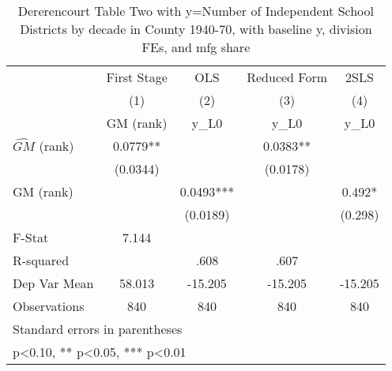 \begin{table}[htbp]\centering
\def\sym#1{\ifmmode^{#1}\else\(^{#1}\)\fi}
\caption{Dererencourt Table Two with y=Number of Independent School Districts by decade in County 1940-70, with baseline y, division FEs, and mfg share}
\begin{tabular}{l*{4}{c}}
\toprule
                    & First Stage   &         OLS   &Reduced Form   &        2SLS   \\
                    &\multicolumn{1}{c}{(1)}&\multicolumn{1}{c}{(2)}&\multicolumn{1}{c}{(3)}&\multicolumn{1}{c}{(4)}\\
                    &\multicolumn{1}{c}{GM  (rank)}&\multicolumn{1}{c}{y\_L0}&\multicolumn{1}{c}{y\_L0}&\multicolumn{1}{c}{y\_L0}\\
\midrule
$\hat{GM}$ (rank)   &      0.0779** &               &      0.0383** &               \\
                    &    (0.0344)   &               &    (0.0178)   &               \\
\addlinespace
GM  (rank)          &               &      0.0493***&               &       0.492*  \\
                    &               &    (0.0189)   &               &     (0.298)   \\
\midrule
F-Stat              &       7.144   &               &               &               \\
R-squared           &               &        .608   &        .607   &               \\
Dep Var Mean        &      58.013   &     -15.205   &     -15.205   &     -15.205   \\
Observations        &         840   &         840   &         840   &         840   \\
\bottomrule
\multicolumn{5}{l}{\footnotesize Standard errors in parentheses}\\
\multicolumn{5}{l}{\footnotesize * p<0.10, ** p<0.05, *** p<0.01}\\
\end{tabular}
\end{table}
